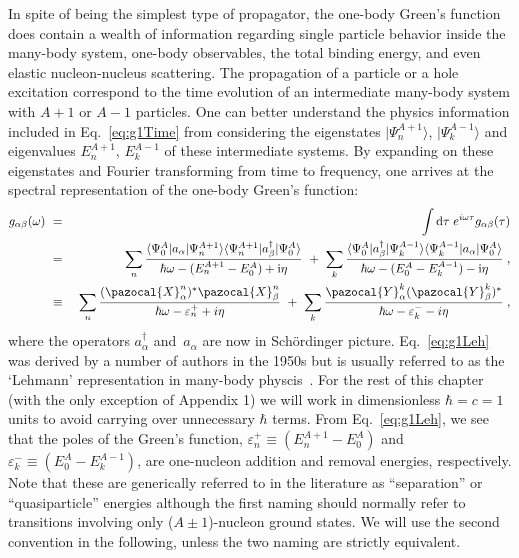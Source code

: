 In spite of being the simplest type of propagator, the one-body Green's function does contain a wealth of information regarding single particle behavior inside the many-body system, one-body observables, the total binding energy, and even elastic nucleon-nucleus scattering.
%
The propagation of a particle or a hole excitation correspond to the time evolution of an intermediate many-body system with $A+1$ or $A-1$ particles.
One can better  understand the physics information included in Eq.~\eqref{eq:g1Time} from considering the eigenstates $\vert\Psi^{A+1}_n\rangle$, $\vert\Psi^{A-1}_k\rangle$ and eigenvalues $E^{A+1}_n$, $E^{A-1}_k$ of these intermediate systems. By expanding on these eigenstates and Fourier transforming from time to frequency, one arrives at the spectral representation of the one-body Green's function:
\begin{eqnarray}
 g_{\alpha\beta}(\omega) ~&=&~ \int {\rm d}\tau \; e^{i\omega\tau} g_{\alpha\beta}(\tau)
 \nonumber \\
 &=&~
 \sum_n  \frac{ 
          \langle\Psi^A_0\vert  	a_\alpha   \vert\Psi^{A+1}_n\rangle
          \langle\Psi^{A+1}_n\vert  a^\dagger_\beta  \vert\Psi^A_0\rangle
              }{\hbar\omega - (E^{A+1}_n - E^A_0) + {\rm i} \eta }
 ~+~ \sum_k \frac{
 		  \langle\Psi^A_0\vert  	a^\dagger_\beta   \vert\Psi^{A-1}_k\rangle
          \langle\Psi^{A-1}_k\vert  a_\alpha  \vert\Psi^A_0\rangle
              }{\hbar\omega - (E^A_0 - E^{A-1}_k) - {\rm i} \eta } \; ,
 \nonumber \\
  &\equiv&~ \sum_n \frac{(\pazocal{X}^{n}_\alpha)^*  \pazocal{X}^{n}_\beta}{\hbar\omega  - \varepsilon^+_{n} + i\eta} 
        ~+~ \sum_k \frac{\pazocal{Y}^{k}_\alpha  (\pazocal{Y}^{k}_\beta)^*}{\hbar\omega  - \varepsilon^-_{k} - i\eta}  \; ,
\label{eq:g1Leh}
\end{eqnarray}
where the operators $a^\dagger_\alpha$ and~$a_\alpha$ are now in Sch\"ordinger picture. 
Eq.~\eqref{eq:g1Leh} was derived by a number of authors in the 1950s but is usually referred to as the `Lehmann' representation in many-body physcis~\cite{ch11_Umezawa1951spRep,ch11_Kallen1952SpRep,ch11_Lehmann1954}.
%
For the rest of this chapter (with the only exception of Appendix 1) we will work in dimensionless $\hbar=c=1$ units to avoid carrying over unnecessary  $\hbar$ terms.
%
From Eq.~\eqref{eq:g1Leh}, we see that the poles of the Green's function,
\hbox{$\varepsilon_n^{+}\equiv(E^{A+1}_n - E^A_0)$} and  \hbox{$\varepsilon_k^{-}\equiv(E^A_0 - E^{A-1}_k)$},
are one-nucleon addition and removal energies, respectively.  Note that these are generically referred to in the literature as ``separation'' or ``quasiparticle'' energies although the first naming should normally refer to transitions involving only ($A\pm1$)-nucleon ground states.  We will use the second convention in the following, unless the two naming are strictly equivalent.
